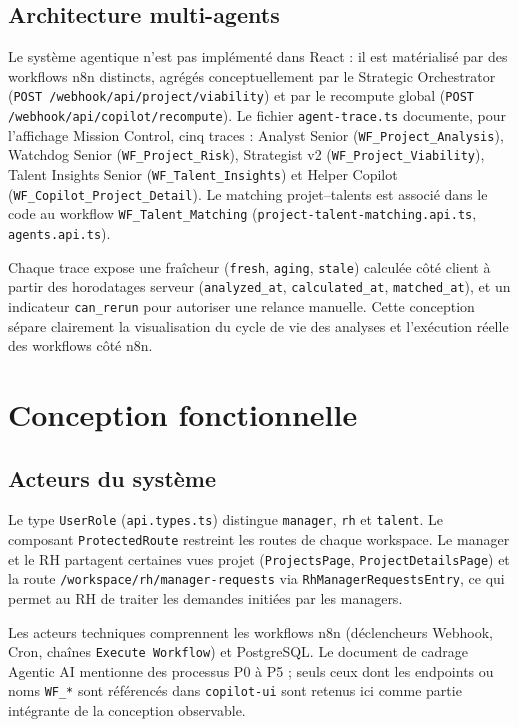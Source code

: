 \subsection{Architecture multi-agents}

Le système agentique n'est pas implémenté dans React : il est matérialisé par des workflows n8n distincts, agrégés conceptuellement par le Strategic Orchestrator (\texttt{POST /webhook/api/project/viability}) et par le recompute global (\texttt{POST /webhook/api/copilot/recompute}). Le fichier \texttt{agent-trace.ts} documente, pour l'affichage Mission Control, cinq traces : Analyst Senior (\texttt{WF\_Project\_Analysis}), Watchdog Senior (\texttt{WF\_Project\_Risk}), Strategist v2 (\texttt{WF\_Project\_Viability}), Talent Insights Senior (\texttt{WF\_Talent\_Insights}) et Helper Copilot (\texttt{WF\_Copilot\_Project\_Detail}). Le matching projet--talents est associé dans le code au workflow \texttt{WF\_Talent\_Matching} (\texttt{project-talent-matching.api.ts}, \texttt{agents.api.ts}).

Chaque trace expose une fraîcheur (\texttt{fresh}, \texttt{aging}, \texttt{stale}) calculée côté client à partir des horodatages serveur (\texttt{analyzed\_at}, \texttt{calculated\_at}, \texttt{matched\_at}), et un indicateur \texttt{can\_rerun} pour autoriser une relance manuelle. Cette conception sépare clairement la visualisation du cycle de vie des analyses et l'exécution réelle des workflows côté n8n.

\section{Conception fonctionnelle}

\subsection{Acteurs du système}

Le type \texttt{UserRole} (\texttt{api.types.ts}) distingue \texttt{manager}, \texttt{rh} et \texttt{talent}. Le composant \texttt{ProtectedRoute} restreint les routes de chaque workspace. Le manager et le RH partagent certaines vues projet (\texttt{ProjectsPage}, \texttt{ProjectDetailsPage}) et la route \texttt{/workspace/rh/manager-requests} via \texttt{RhManagerRequestsEntry}, ce qui permet au RH de traiter les demandes initiées par les managers.

Les acteurs techniques comprennent les workflows n8n (déclencheurs Webhook, Cron, chaînes \texttt{Execute Workflow}) et PostgreSQL. Le document de cadrage Agentic AI mentionne des processus P0 à P5 ; seuls ceux dont les endpoints ou noms \texttt{WF\_*} sont référencés dans \texttt{copilot-ui} sont retenus ici comme partie intégrante de la conception observable.

